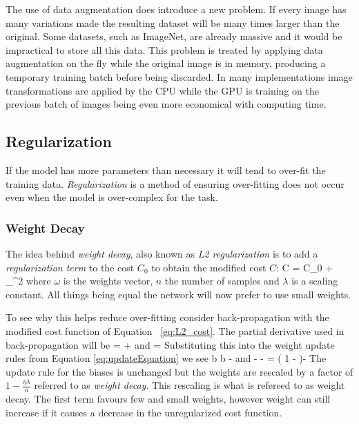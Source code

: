 The use of data augmentation does introduce a new problem.
If every image has many variations made the resulting dataset will be many times larger than the original.
Some datasets, such as ImageNet\citep{deng2012imagenet}, are already massive and it would be impractical to store all this data\citep{goyal2014object}.
This problem is treated by applying data augmentation on the fly while the original image is in memory, producing a temporary training batch before being discarded.
In many implementations image transformations are applied by the CPU while the GPU is training on the previous batch of images being even more economical with computing time.


\subsection{Regularization}
If the model has more parameters than necessary it will tend to over-fit the training data\citep{goyal2014object}.
\textit{Regularization} is a method of ensuring over-fitting does not occur even when the model is over-complex for the task.

\subsubsection{Weight Decay}
The idea behind \textit{weight decay}, also known as \textit{L2 regularization} is to add a \textit{regularization term} to the cost $C_0$ to obtain the modified cost $C$:
\be
C = C_0 + \sum_\omega \omega^2
\label{eq:L2_cost}
\ee
where $\omega$ is the weights vector, $n$ the number of samples and $\lambda$ is a scaling constant.
All things being equal the network will now prefer to use small weights.

To see why this helps reduce over-fitting consider back-propagation with the modified cost function of Equation ~\ref{eq:L2_cost}.
The partial derivative used in back-propagation will be 
\be
{} =  + \omega
\ee
and 
\be
{} =  
\ee
Substituting this into the weight update rules from Equation \ref{eq:updateEquation} we see
\be
b \rightarrow b - \eta {}
\ee
and 
\be
\omega \rightarrow \omega - \eta {} - \omega = \left( 1 - \right)\omega - \eta {}
\ee
The update rule for the biases is unchanged but the weights are rescaled by a factor of $1-\frac{\eta \lambda}{n}$ referred to as \textit{weight decay}.
This rescaling is what is refereed to as weight decay.
The first term favours few and small weights, however weight can still increase if it causes a decrease in the unregularized cost function\citep{bengio2012practical}.


